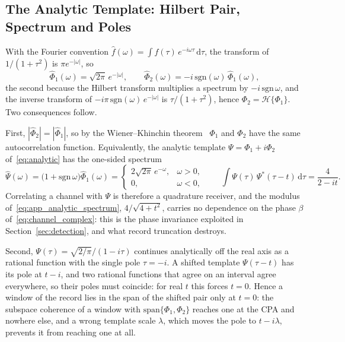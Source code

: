\subsection{The Analytic Template: Hilbert Pair, Spectrum and Poles}\label{app:analytic_template}

With the Fourier convention $\hat{f}(\omega) = \int f(\tau)\,e^{-i\omega\tau}\,\mathrm{d}\tau$, the transform of $1/(1+\tau^{2})$ is $\pi e^{-|\omega|}$, so
\begin{equation}
    \hat{\Phi}_1(\omega) = \sqrt{2\pi}\,e^{-|\omega|},
    \qquad
    \hat{\Phi}_2(\omega) = -i\,\mathrm{sgn}(\omega)\,\hat{\Phi}_1(\omega),
    \label{eq:app_spectra}
\end{equation}
the second because the Hilbert transform multiplies a spectrum by $-i\,\mathrm{sgn}\,\omega$, and the inverse transform of $-i\pi\,\mathrm{sgn}(\omega)\,e^{-|\omega|}$ is $\tau/(1+\tau^{2})$, hence $\Phi_2 = \mathcal{H}\{\Phi_1\}$. Two consequences follow.

First, $|\hat{\Phi}_2| = |\hat{\Phi}_1|$, so by the Wiener--Khinchin theorem~\cite{wiener1930generalized,khintchine1934korrelationstheorie,bracewell2000fourier} $\Phi_1$ and $\Phi_2$ have the same autocorrelation function. Equivalently, the analytic template $\Psi = \Phi_1 + i\Phi_2$ of~\eqref{eq:analytic} has the one-sided spectrum
\begin{equation}
    \hat{\Psi}(\omega) = \big(1 + \mathrm{sgn}\,\omega\big)\hat{\Phi}_1(\omega)
    = \begin{cases} 2\sqrt{2\pi}\,e^{-\omega}, & \omega > 0,\\ 0, & \omega < 0,\end{cases}
    \qquad
    \int \Psi(\tau)\,\Psi^{*}(\tau - t)\,\mathrm{d}\tau = \frac{4}{2 - it}.
    \label{eq:app_analytic_spectrum}
\end{equation}
Correlating a channel with $\Psi$ is therefore a quadrature receiver, and the modulus of~\eqref{eq:app_analytic_spectrum}, $4/\sqrt{4+t^{2}}$, carries no dependence on the phase $\beta$ of~\eqref{eq:channel_complex}: this is the phase invariance exploited in Section~\ref{sec:detection}, and what record truncation destroys.

Second, $\Psi(\tau) = \sqrt{2/\pi}/(1 - i\tau)$ continues analytically off the real axis as a rational function with the single pole $\tau = -i$. A shifted template $\Psi(\tau - t)$ has its pole at $t - i$, and two rational functions that agree on an interval agree everywhere, so their poles must coincide: for real $t$ this forces $t = 0$. Hence a window of the record lies in the span of the shifted pair only at $t = 0$: the subspace coherence of a window with $\mathrm{span}\{\Phi_1, \Phi_2\}$ reaches one at the CPA and nowhere else, and a wrong template scale $\lambda$, which moves the pole to $t - i\lambda$, prevents it from reaching one at all.\label{app:coherence_uniqueness}
